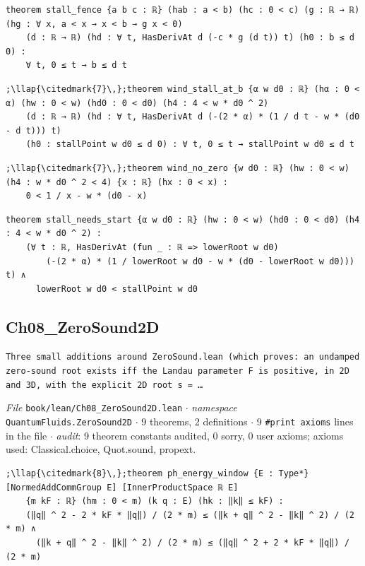 \begin{lstlisting}[style=leancat]
theorem stall_fence {a b c : ℝ} (hab : a < b) (hc : 0 < c) (g : ℝ → ℝ) (hg : ∀ x, a < x → x < b → g x < 0)
    (d : ℝ → ℝ) (hd : ∀ t, HasDerivAt d (-c * g (d t)) t) (h0 : b ≤ d 0) :
    ∀ t, 0 ≤ t → b ≤ d t
\end{lstlisting}

\begin{lstlisting}[style=leancat]
;\llap{\citedmark{7}\,};theorem wind_stall_at_b {α w d0 : ℝ} (hα : 0 < α) (hw : 0 < w) (hd0 : 0 < d0) (h4 : 4 < w * d0 ^ 2)
    (d : ℝ → ℝ) (hd : ∀ t, HasDerivAt d (-(2 * α) * (1 / d t - w * (d0 - d t))) t)
    (h0 : stallPoint w d0 ≤ d 0) : ∀ t, 0 ≤ t → stallPoint w d0 ≤ d t
\end{lstlisting}

\begin{lstlisting}[style=leancat]
;\llap{\citedmark{7}\,};theorem wind_no_zero {w d0 : ℝ} (hw : 0 < w) (h4 : w * d0 ^ 2 < 4) {x : ℝ} (hx : 0 < x) :
    0 < 1 / x - w * (d0 - x)
\end{lstlisting}

\begin{lstlisting}[style=leancat]
theorem stall_needs_start {α w d0 : ℝ} (hw : 0 < w) (hd0 : 0 < d0) (h4 : 4 < w * d0 ^ 2) :
    (∀ t : ℝ, HasDerivAt (fun _ : ℝ => lowerRoot w d0)
        (-(2 * α) * (1 / lowerRoot w d0 - w * (d0 - lowerRoot w d0))) t) ∧
      lowerRoot w d0 < stallPoint w d0
\end{lstlisting}

\subsection{Ch08\_\allowbreak{}ZeroSound2D}
{\footnotesize\raggedright\texttt{Three small additions around ZeroSound.\allowbreak{}lean (which proves: an undamped zero-\allowbreak{}sound root exists iff the Landau parameter F is positive,\allowbreak{} in 2D and 3D,\allowbreak{} with the explicit 2D root s = …}\par}
{\footnotesize\raggedright\emph{File} \texttt{book/lean/Ch08\_\allowbreak{}ZeroSound2D.\allowbreak{}lean} $\cdot$ \emph{namespace} \texttt{QuantumFluids.\allowbreak{}ZeroSound2D} $\cdot$ 9 theorems, 2 definitions $\cdot$ 9 \texttt{\#print axioms} lines in the file $\cdot$ \emph{audit}: 9 theorem constants audited, 0 sorry, 0 user axioms; axioms used: Classical.choice, Quot.sound, propext.\par}
\begin{lstlisting}[style=leancat]
;\llap{\citedmark{8}\,};theorem ph_energy_window {E : Type*} [NormedAddCommGroup E] [InnerProductSpace ℝ E]
    {m kF : ℝ} (hm : 0 < m) (k q : E) (hk : ‖k‖ ≤ kF) :
    (‖q‖ ^ 2 - 2 * kF * ‖q‖) / (2 * m) ≤ (‖k + q‖ ^ 2 - ‖k‖ ^ 2) / (2 * m) ∧
      (‖k + q‖ ^ 2 - ‖k‖ ^ 2) / (2 * m) ≤ (‖q‖ ^ 2 + 2 * kF * ‖q‖) / (2 * m)
\end{lstlisting}

